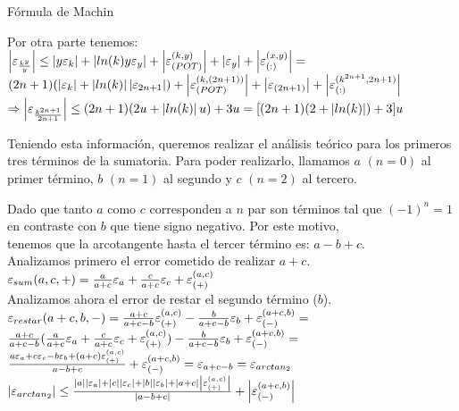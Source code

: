\begin{subsection}{Fórmula de Machin}
	\pa
	
	Por otra parte tenemos:\\
	
	$\left|\varepsilon _{\frac{k^y}{y}}\right| \leq \left|y\varepsilon _{k}\right| + \left|ln(k)y\varepsilon _{y}\right| + \left|\varepsilon _{({POT})}^{({k,y})}\right| + \left|\varepsilon _{y}\right| + \left|\varepsilon _{({:})}^{({x,y})}\right| =$\\
	
	$(2n+1)(\left|\varepsilon _{k}\right| + \left|ln(k)\right|\left|\varepsilon _{2n+1}\right|) + \left|\varepsilon _{({POT})}^{({k,(2n+1)})}\right| + \left|\varepsilon _{(2n+1)}\right| + \left|\varepsilon _{({:})}^{({k^{2n+1},2n+1})}\right|$\\
	
	$\Rightarrow \left|\varepsilon _{\frac{k^{2n+1}}{2n+1}}\right| \leq (2n+1)(2u + \left|ln(k)\right|u) + 3u = [(2n+1)(2 + \left|ln(k)\right|) + 3]u$\\
	
	\pa
	
	Teniendo esta información, queremos realizar el análisis teórico para los primeros tres términos de la sumatoria. Para poder realizarlo, llamamos $a$ $(n=0)$ al primer término,
	$b$ $(n=1)$ al segundo y $c$ $(n=2)$ al tercero.
	
	Dado que tanto $a$ como $c$ corresponden a $n$ par son términos tal que $(-1)^n = 1$ en contraste con $b$ que tiene signo negativo. Por este motivo,\\
	tenemos que la arcotangente hasta el tercer término es: $a - b + c$.\\
	
	Analizamos primero el error cometido de realizar $a+c$.\\
	
	$\varepsilon _{sum}({a,c,+}) = \frac{a}{a+c}\varepsilon _{a} + \frac{c}{a+c}\varepsilon _{c} + \varepsilon _{({+})}^{({a,c})}$\\
	
	Analizamos ahora el error de restar el segundo término ($b$).\\
		
	$\varepsilon _{restar}({a+c,b,-}) = \frac{a+c}{a+c-b}\varepsilon _{({+})}^{({a,c})} - \frac{b}{a+c-b}\varepsilon _{b} + \varepsilon _{({-})}^{({a+c,b})} =$\\
	
	$\frac{a+c}{a+c-b}(\frac{a}{a+c}\varepsilon _{a} + \frac{c}{a+c}\varepsilon _{c} + \varepsilon _{({+})}^{({a,c})}) - \frac{b}{a+c-b}\varepsilon _{b} + \varepsilon _{({-})}^{({a+c,b})} =$\\
	
	$\frac{a\varepsilon _{a} + c\varepsilon _{c} - b\varepsilon _{b} + (a+c)\varepsilon _{({+})}^{({a,c})}}{a-b+c} + \varepsilon _{({-})}^{({a+c,b})} = \varepsilon _{a+c-b} = \varepsilon _{arctan_2}$\\
	
	$\left|\varepsilon _{arctan_2}\right| \leq \frac{|a||\varepsilon _{a}| + |c||\varepsilon _{c}| + |b||\varepsilon _{b}| + |a+c|\left|\varepsilon _{({+})}^{({a,c})}\right|}{|a-b+c|} + \left|\varepsilon _{({-})}^{({a+c,b})}\right|$\\
	

\end{subsection}
